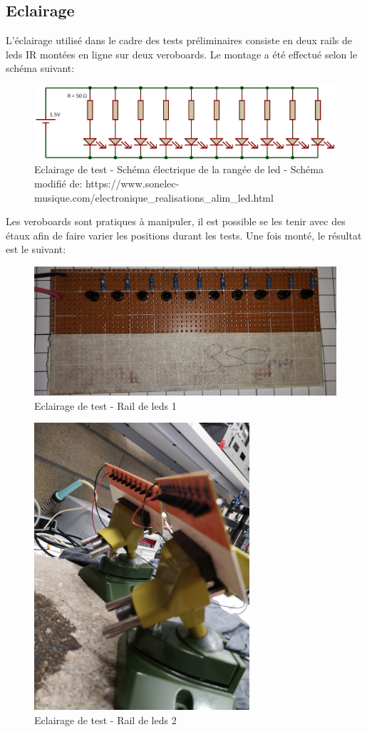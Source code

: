 \subsection{Eclairage}
L'éclairage utilisé dans le cadre des tests préliminaires consiste en deux rails de leds IR montées en ligne sur deux veroboards.
Le montage a été effectué selon le schéma suivant:
\begin{figure}[H]
    \centering
    \includegraphics[width=13cm]{assets/figures/schema_leds1.png}
    \caption{Eclairage de test - Schéma électrique de la rangée de led - Schéma modifié de: https://www.sonelec-musique.com/electronique_realisations_alim_led.html}
\end{figure}
Les veroboards sont pratiques à manipuler, il est possible se les tenir avec des étaux afin de faire varier les positions durant les tests. Une fois monté,
le résultat est le suivant:
\begin{figure}[H]
    \centering
    \includegraphics[width=13cm]{assets/figures/rail_led1.jpg}
    \caption{Eclairage de test - Rail de leds 1}
\end{figure}

\begin{figure}[H]
    \centering
    \includegraphics[width=8cm]{assets/figures/rail_led2.jpg}
    \caption{Eclairage de test - Rail de leds 2}
\end{figure}
